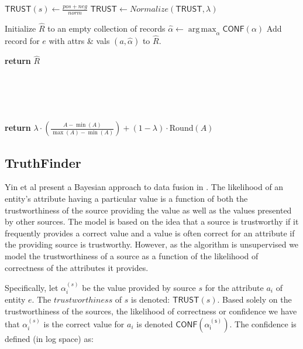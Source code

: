 \documentclass{acm_proc_article-sp}
\DeclareMathOperator*{\argmax}{arg\,max}
\begin{document}
\begin{algorithm}
\begin{algorithmic}[1]
		        \State $\mathsf{TRUST}(s) \gets \frac{pos + neg}{norm}$ 
	\EndFor
         \State $\mathsf{TRUST} \gets Normalize(\mathsf{TRUST},\lambda)$


	\State Initialize $\hat{R}$ to an empty collection of records
		\State $\hat{\alpha} \leftarrow \argmax_{\alpha} \mathsf{CONF}(\alpha)$
		\EndFor
		\State Add record for $e$ with attrs \& vals $(a, \hat{\alpha})$ to $\hat{R}$.
	\EndFor

\EndWhile
\State \textbf{return} $\hat{R}$
\EndFunction

 \\

 \\
 \\
 \\

\State \textbf{return} $\lambda \cdot \left (\frac{A - \min(A)}{\max(A)-\min(A)} \right) + (1-\lambda) \cdot ${\sc Round}$( A )$

\EndFunction
\end{algorithmic}
\end{algorithm}  


\subsection{TruthFinder}

Yin et al present a Bayesian approach to data fusion in \cite{yin:truth}.  The likelihood of an entity's attribute having a particular value is a function of both the trustworthiness of the source providing the value as well as the values presented by other sources. The model is based on the idea that a source is trustworthy if it frequently provides a correct value and a value is often correct for an attribute if the providing source is trustworthy. However, as the algorithm is unsupervised we model the trustworthiness of a source as a function of the likelihood of correctness of the attributes it provides. 

Specifically, let $\alpha_i^{(s)}$ be the value provided by source $s$ for the attribute $a_i$ of entity $e$. The $trustworthiness$ of $s$ is denoted: $\mathsf{TRUST}(s)$. Based solely on the trustworthiness of the sources, the likelihood of correctness or confidence we have that $\alpha_i^{(s)}$ is the correct value for $a_i$ is denoted $\mathsf{CONF(\alpha_i^{(s)})}$.  The confidence is defined (in log space) as:
\end{document}
